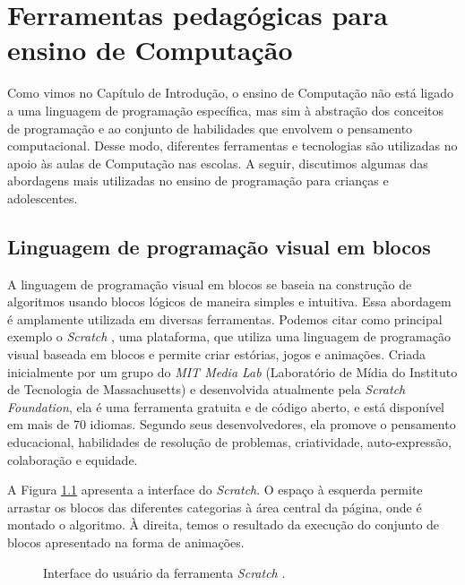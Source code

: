 
\chapter{Ferramentas pedagógicas para ensino de Computação}
\label{related_tools}

Como vimos no Capítulo de Introdução, o ensino de Computação não está ligado a uma linguagem de programação específica, mas sim à abstração dos conceitos de programação e ao conjunto de habilidades que envolvem o pensamento computacional. Desse modo, diferentes ferramentas e tecnologias são utilizadas no apoio às aulas de Computação nas escolas. A seguir, discutimos algumas das abordagens mais utilizadas no ensino de programação para crianças e adolescentes.

\section{Linguagem de programação visual em blocos}

A linguagem de programação visual em blocos se baseia na construção de algoritmos usando blocos lógicos de maneira simples e intuitiva. Essa abordagem é amplamente utilizada em diversas ferramentas. Podemos citar como principal exemplo o \textit{Scratch} \citep{scratch2024}, uma plataforma, que utiliza uma linguagem de programação visual baseada em blocos e permite criar estórias, jogos e animações. Criada inicialmente por um grupo do \textit{MIT Media Lab} (Laboratório de Mídia do Instituto de Tecnologia de Massachusetts) e desenvolvida atualmente pela \textit{Scratch Foundation}, ela é uma ferramenta gratuita e de código aberto, e está disponível em mais de 70 idiomas. Segundo seus desenvolvedores, ela promove o pensamento educacional, habilidades de resolução de problemas, criatividade, auto-expressão, colaboração e equidade.

A Figura \ref{figure:sctrach} apresenta a interface do \textit{Scratch}. O espaço à esquerda permite arrastar os blocos das diferentes categorias à área central da página, onde é montado o algoritmo. À direita, temos o resultado da execução do conjunto de blocos apresentado na forma de animações.

\begin{figure}[h!]
    \centering
    \setlength{\fboxrule}{0.1pt} %
    \caption{Interface do usuário da ferramenta \textit{Scratch} \citep{scratch2024}.}
    \label{figure:sctrach}
\end{figure}

